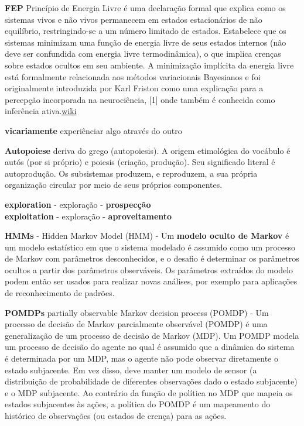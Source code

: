 \documentclass[
  12pt,
]{book}
\begin{document}
\textbf{FEP} Princípio de Energia Livre é uma declaração formal que explica como os sistemas vivos e não vivos permanecem em estados estacionários de não equilíbrio, restringindo-se a um número limitado de estados. Estabelece que os sistemas minimizam uma função de energia livre de seus estados internos (não deve ser confundida com energia livre termodinâmica), o que implica crenças sobre estados ocultos em seu ambiente. A minimização implícita da energia livre está formalmente relacionada aos métodos variacionais Bayesianos e foi originalmente introduzida por Karl Friston como uma explicação para a percepção incorporada na neurociência, {[}1{]} onde também é conhecida como inferência ativa.\href{https://pt.wikipedia.org/wiki/Princ\%C3\%ADpio_da_energia_livre}{wiki}

\textbf{vicariamente} experiênciar algo através do outro

\textbf{Autopoiese} deriva do grego (autopoiesis). A origem etimológica do vocábulo é autós (por si próprio) e poiesis (criação, produção). Seu significado literal é autoprodução. Os subsistemas produzem, e reproduzem, a sua própria organização circular por meio de seus próprios componentes.

\textbf{exploration} - exploração - \textbf{prospecção}\\
\textbf{exploitation} - exploração - \textbf{aproveitamento}

\textbf{HMMs} - Hidden Markov Model (HMM) - Um \textbf{modelo oculto de Markov} é um modelo estatístico em que o sistema modelado é assumido como um processo de Markov com parâmetros desconhecidos, e o desafio é determinar os parâmetros ocultos a partir dos parâmetros observáveis. Os parâmetros extraídos do modelo podem então ser usados para realizar novas análises, por exemplo para aplicações de reconhecimento de padrões.

\textbf{POMDPs} partially observable Markov decision process (POMDP) - Um processo de decisão de Markov parcialmente observável (POMDP) é uma generalização de um processo de decisão de Markov (MDP). Um POMDP modela um processo de decisão do agente no qual é assumido que a dinâmica do sistema é determinada por um MDP, mas o agente não pode observar diretamente o estado subjacente. Em vez disso, deve manter um modelo de sensor (a distribuição de probabilidade de diferentes observações dado o estado subjacente) e o MDP subjacente. Ao contrário da função de política no MDP que mapeia os estados subjacentes às ações, a política do POMDP é um mapeamento do histórico de observações (ou estados de crença) para as ações.
\end{document}
